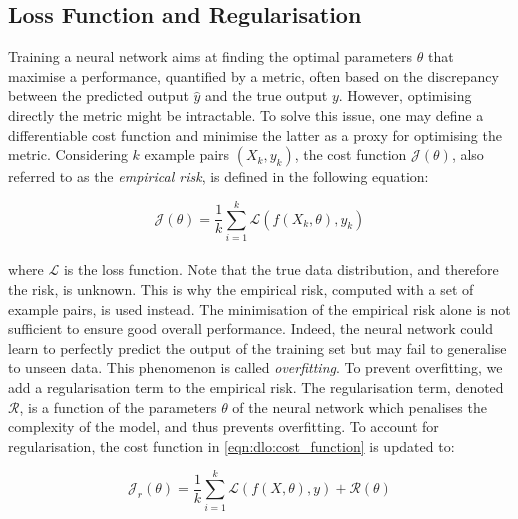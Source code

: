 
\subsection{Loss Function and Regularisation}
Training a neural network aims at finding the optimal parameters $\theta$ that
maximise a performance, quantified by a metric, often based on the discrepancy
between the predicted output $\hat{y}$ and the true output $y$. However,
optimising directly the metric might be intractable. To solve this issue, one
may define a differentiable cost function and minimise the latter as a proxy for
optimising the metric. Considering $k$ example pairs $(X_k, y_k)$, the cost
function $\mathcal{J}(\theta)$, also referred to as the
\emph{empirical risk}, is defined in the following equation:

\begin{equation}
  \label{eqn:dlo:cost_function}
  \mathcal{J}(\theta) = \frac{1}{k} \sum_{i=1}^{k} \mathcal{L}(f(X_k,\theta), y_k)
\end{equation}\\

\noindent where $\mathcal{L}$ is the loss function. Note that the true data
distribution, and therefore the risk, is unknown. This is why the empirical
risk, computed with a set of example pairs, is used instead. The minimisation of
the empirical risk alone is not sufficient to ensure good overall performance.
Indeed, the neural network could learn to perfectly predict the output of the
training set but may fail to generalise to unseen data. This phenomenon is
called \emph{overfitting}. To prevent overfitting, we add a regularisation term
to the empirical risk. The regularisation term, denoted $\mathcal{R}$, is a
function of the parameters $\theta$ of the neural network which penalises the
complexity of the model, and thus prevents overfitting. To account for
regularisation, the cost function in \cref{eqn:dlo:cost_function} is updated to:

\begin{equation}
  \label{eqn:dlo:regularised_cost_fn}
  \mathcal{J}_r(\theta) =   \frac{1}{k} \sum_{i=1}^{k} \mathcal{L}(f(X,\theta), y) + \mathcal{R}(\theta) 
\end{equation}\\

